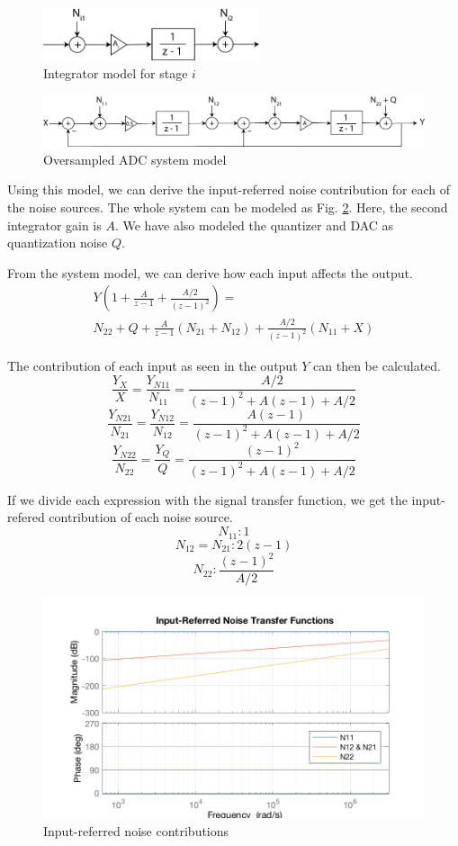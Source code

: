 \documentclass[conference]{IEEEtran}
\begin{document}
\begin{figure}[!h]
\centering
\includegraphics[width=2.5in]{img/integrator-model}
\caption{Integrator model for stage $i$}
\label{integrator-model}
\end{figure}

\begin{figure}[!b]
\centering
\includegraphics[width=\textwidth]{img/system}
\caption{Oversampled ADC system model}
\label{system-model}
\end{figure}


Using this model, we can derive the input-referred noise contribution for each of the noise sources. The whole system can be modeled as Fig. \ref{system-model}. Here, the second integrator gain is $A$. We have also modeled the quantizer and DAC as quantization noise $Q$.

From the system model, we can derive how each input affects the output.
\begin{multline}
Y \left( 1 + \frac{A}{z-1} + \frac{A/2}{(z-1)^2}\right) = \\ N_{22} + Q + \frac{A}{z-1}(N_{21}+N_{12}) + \frac{A/2}{(z-1)^2}(N_{11}+X)
\end{multline}

The contribution of each input as seen in the output $Y$ can then be calculated.
$$\frac{Y_X}{X} = \frac{Y_{N11}}{N_{11}} = \frac{A/2}{(z-1)^2+A(z-1)+A/2}$$
$$\frac{Y_{N21}}{N_{21}} = \frac{Y_{N12}}{N_{12}} = \frac{A(z-1)}{(z-1)^2+A(z-1)+A/2}$$
$$\frac{Y_{N22}}{N_{22}} = \frac{Y_Q}{Q} = \frac{(z-1)^2}{(z-1)^2+A(z-1)+A/2}$$

If we divide each expression with the signal transfer function, we get the input-refered contribution of each noise source.
$$N_{11}: 1$$
$$N_{12} = N_{21}: 2(z-1)$$
$$N_{22}: \frac{(z-1)^2}{A/2}$$

\begin{figure}[h]
\centering
\includegraphics[width=\linewidth]{input-referred-bode}
\caption{Input-referred noise contributions}
\label{noise-tf}
\end{figure}
\end{document}
